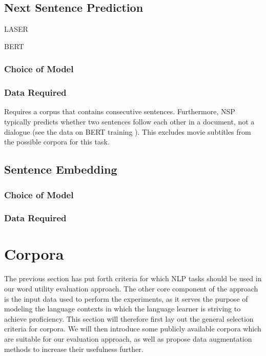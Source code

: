 \subsection{Next Sentence Prediction}

\begin{description}
	\item[LASER] \cite{artetxeMassivelyMultilingualSentence2019}
	\item[BERT] \cite{reimersMakingMonolingualSentence2020}
\end{description}

\subsubsection{Choice of Model}
\subsubsection{Data Required}

Requires a corpus that contains consecutive sentences.
Furthermore, NSP typically predicts whether two sentences follow each other in a document, not a dialogue (see the data on BERT training \cite{kentonBertPretrainingDeep2019}).
This excludes movie subtitles from the possible corpora for this task.


\subsection{Sentence Embedding}
\subsubsection{Choice of Model}
\subsubsection{Data Required}




\section{Corpora}
The previous section has put forth criteria for which NLP tasks should be used in our word utility evaluation approach.
The other core component of the approach is the input data used to perform the experiments, as it serves the purpose of modeling the language contexts in which the language learner is striving to achieve proficiency.
This section will therefore first lay out the general selection criteria for corpora.
We will then introduce some publicly available corpora which are suitable for our evaluation approach, as well as propose data augmentation methods to increase their usefulness further.



